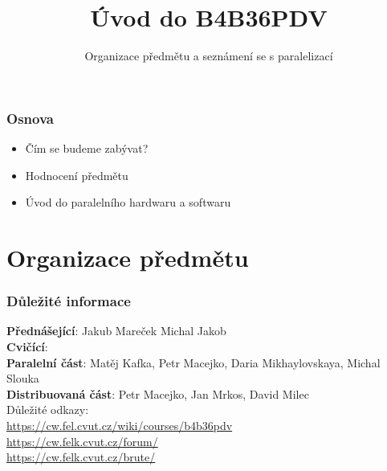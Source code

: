 \documentclass[usenames,dvipsnames,9pt]{beamer}
\title{Úvod do B4B36PDV}
\subtitle{Organizace předmětu a seznámení se s paralelizací}
\date{} %
\institute{B4B36PDV -- Paralelní a distribuované výpočty}
\begin{document}
\maketitle

\begin{frame}
  \frametitle{Osnova}
  \begin{itemize}
    \item Čím se budeme zabývat?
    \item Hodnocení předmětu\\[1.5em]
    \item Úvod do paralelního hardwaru a softwaru
  \end{itemize}
\end{frame}

\section{Organizace předmětu}

\begin{frame}
  \frametitle{Důležité informace}
  \small
  \textbf{Přednášející}: \hspace{5pt} Jakub Mareček \hspace{10pt} Michal Jakob \\[1em]
  \textbf{Cvičící}: \\
  \hspace*{10pt} \textbf{Paralelní část}: Matěj Kafka, Petr Macejko, Daria Mikhaylovskaya, Michal Slouka  \\
  \hspace*{10pt} \textbf{Distribuovaná část}: Petr Macejko, Jan Mrkos, David Milec \\[3.5em]
  Důležité odkazy: \\[0.7em]
  {\Large\url{https://cw.fel.cvut.cz/wiki/courses/b4b36pdv}} \\[0.7em]
  \url{https://cw.felk.cvut.cz/forum/} \\
  \url{https://cw.felk.cvut.cz/brute/}
\end{frame}
\end{document}
